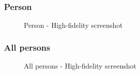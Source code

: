 \documentclass[11pt, letterpaper]{article}
\begin{document}
\subsubsection*{Person}
\begin{figure}[H]
    \centering
    \setlength{\fboxsep}{0pt}
    \caption{Person - High-fidelity screenshot}
    \label{fig:PageScreenshot_Person}
\end{figure}

\subsubsection*{All persons}
\label{sec:wrong_blurred_box}
\begin{figure}[H]
    \centering
    \setlength{\fboxsep}{0pt}
    \caption{All persons - High-fidelity screenshot}
    \label{fig:PageScreenshot_All_persons}
\end{figure}
\end{document}
